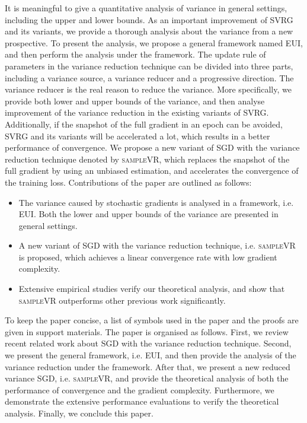 \documentclass[letterpaper]{article}
\begin{document}
It is meaningful to give a quantitative analysis  of variance in general settings, including the upper and lower bounds.   As an important improvement of SVRG and its variants, we provide a thorough analysis about the variance from a new prospective. To present the analysis, we propose  a general framework named EUI, and then perform the analysis under the framework. The  update rule of parameters in the variance reduction technique can be divided into three parts, including a variance source, a variance reducer and a progressive direction. The variance reducer is the real reason to reduce the variance.  More specifically, we provide both lower and upper bounds of the variance, and then analyse improvement of the variance reduction in the existing variants of SVRG.  Additionally, if the snapshot of the full gradient in an epoch can be avoided, SVRG and its variants will be accelerated a lot, which results in a better performance of convergence. We propose a new variant of SGD with the variance reduction technique denoted by \textsc{sampleVR}, which replaces the snapshot of the full gradient by using an unbiased estimation, and accelerates the convergence of the training loss.  Contributions of the paper are outlined as follows:
\begin{itemize}
\item  The variance caused by stochastic gradients is analysed in a framework, i.e. EUI. Both the lower and upper bounds of the variance are presented in general settings.
\item A new variant of SGD with the variance reduction technique, i.e. \textsc{sampleVR} is proposed, which achieves a linear convergence rate with low gradient complexity.
\item Extensive empirical studies verify our theoretical analysis, and show that \textsc{sampleVR} outperforms  other previous work significantly. 
\end{itemize}

To keep the paper concise, a list of symbols   used in the paper and the proofs are given in support materials. The paper is organised as follows. First, we review recent related work about SGD with the variance reduction technique. Second, we  present the general framework, i.e. EUI, and then provide the analysis of the variance reduction under the framework. After that, we present a new reduced variance SGD, i.e. \textsc{sampleVR}, and provide the theoretical analysis of both the performance of convergence and the gradient complexity.   Furthermore, we  demonstrate the extensive performance evaluations to verify the theoretical analysis. Finally, we conclude this paper. 
\end{document}
